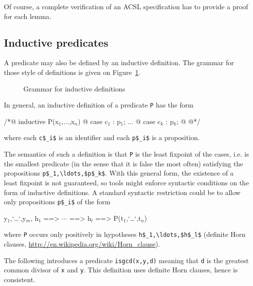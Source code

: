 Of course, a complete verification of an ACSL specification has to
provide a proof for each lemma.

\subsection{Inductive predicates}
\label{sec:inductivepredicates}

A predicate may also be defined by an inductive definition. The
grammar for those style of definitions is given on
Figure~\ref{fig:gram:inductive}.
\begin{figure}[t]
  \begin{cadre} 
    \end{cadre}
  \caption{Grammar for inductive definitions}
\label{fig:gram:inductive}
\end{figure}

In general, an inductive definition of a predicate \lstinline|P| has the form
\begin{listing}{1}
/*@ inductive P(x$_1$,$\ldots$,x$_n$) {
  @   case c$_1$ : p$_1$;
...
  @   case c$_k$ : p$_k$;
  @ }
  @*/
\end{listing}
where each \lstinline|c$_i$| is an identifier and each \lstinline|p$_i$| 
is a proposition.

The semantics of such a definition is that \lstinline|P| is the least fixpoint
of the cases, i.e. is the smallest predicate (in the sense that it is
false the most often) satisfying the propositions \lstinline|p$_1,\ldots,$p$_k$|.
With this general form, the existence of a least fixpoint is not
guaranteed, so tools might enforce syntactic conditions on the form of
inductive definitions. A standard syntactic restriction could be to
allow only propositions \lstinline|p$_i$| of the form
\begin{listing-nonumber}
\forall y$_1$,`\dots`,y$_m$, h$_1$ ==> $\cdots$ ==> h$_l$ ==> P(t$_1$,`\dots`,t$_n$)
\end{listing-nonumber}
where \lstinline|P| occurs only positively in hypotheses \lstinline|h$_1,\ldots,$h$_l$|
(definite Horn clauses,
\url{http://en.wikipedia.org/wiki/Horn_clause}).

\begin{example}
  The following introduces a predicate \lstinline|isgcd(x,y,d)| meaning
  that \lstinline|d| is the greatest common divisor of \lstinline|x|
  and \lstinline|y|.
  This definition uses definite Horn clauses, hence is consistent.
\end{example}


